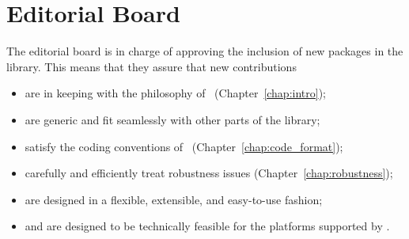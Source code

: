 


\chapter{Editorial Board\label{chap:submission}}


The editorial board is in charge of approving the inclusion of new packages
in the library.  This means that they assure that new contributions
\begin{itemize}
   \item are in keeping with the philosophy of \cgal\ (Chapter~\ref{chap:intro});
   \item are generic and fit seamlessly with other parts of the library;
   \item satisfy the coding conventions of \cgal\ (Chapter~\ref{chap:code_format});
   \item carefully and efficiently treat robustness issues
         (Chapter~\ref{chap:robustness});
   \item are designed in a flexible, extensible, and easy-to-use fashion;
   \item and are designed to be technically feasible for the platforms
         supported by \cgal.
\end{itemize}

